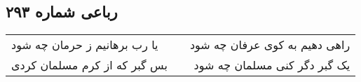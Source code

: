 \begin{center}
\section*{رباعی شماره ۲۹۳}
\label{sec:sh293}
\begin{longtable}{l p{0.5cm} r}
یا رب برهانیم ز حرمان چه شود
&&
راهی دهیم به کوی عرفان چه شود
\\
بس گبر که از کرم مسلمان کردی
&&
یک گبر دگر کنی مسلمان چه شود
\\
\end{longtable}
\end{center}
